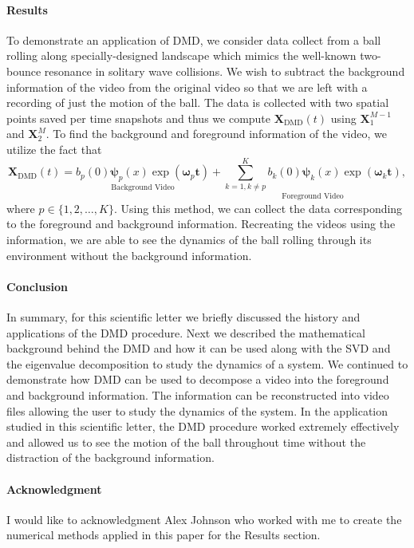 \documentclass[12pt]{article}%
\begin{document}
\paragraph{Results}

To demonstrate an application of DMD, we consider data collect from a ball rolling along specially-designed landscape which mimics the well-known two-bounce resonance in solitary wave collisions. We wish to subtract the background information of the video from the original video so that we are left with a recording of just the motion of the ball. The data is collected with two spatial points saved per time snapshots and thus we compute $\mathbf{X}_\text{DMD}(t)$ using $\mathbf{X}_1^{M-1}$ and $\mathbf{X}_2^{M}$. To find the background and foreground information of the video, we utilize the fact that
\begin{equation}
    \mathbf{X}_\text{DMD}(t) =  \underset{\text{Background Video}}{b_p(0) \mathbf{\psi}_p(x) \exp(\mathbf{\omega}_p \mathbf{t})} + \underset{\text{Foreground Video}}{\sum_{k=1, k \neq p}^K b_k(0) \mathbf{\psi}_k(x) \exp(\mathbf{\omega}_k \mathbf{t})},
\end{equation}
where $p \in \{1, 2, \dots, K\}$. Using this method, we can collect the data corresponding to the foreground and background information. Recreating the videos using the information, we are able to see the dynamics of the ball rolling through its environment without the background information.  

\paragraph{Conclusion}\label{Sec: Conclusion}

In summary, for this scientific letter we briefly discussed the history and applications of the DMD procedure. Next we described the mathematical background behind the DMD and how it can be used along with the SVD and the eigenvalue decomposition to study the dynamics of a system. We continued to demonstrate how DMD can be used to decompose a video into the foreground and background information. The information can be reconstructed into video files allowing the user to study the dynamics of the system. In the application studied in this scientific letter, the DMD procedure worked extremely effectively and allowed us to see the motion of the ball throughout time without the distraction of the background information. 


\paragraph*{Acknowledgment}

I would like to acknowledgment Alex Johnson who worked with me to create the numerical methods applied in this paper for the Results section. 
\end{document}
